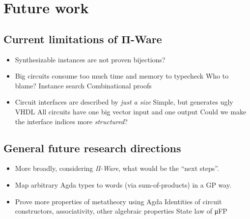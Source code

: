 
    \section{Future work}
    \label{sec:future-work}

        \subsection{Current limitations of Π-Ware}
        \label{subsec:current-limitations}
            \begin{itemize}
                \item Synthesizable instances are not proven bijections?
                \item Big circuits consume too much time and memory to typecheck
                    \subitem Who to blame?
                    \subitem Instance search
                    \subitem Combinational proofs
                \item Circuit interfaces are described by \emph{just a size}
                    \subitem Simple, but generates ugly VHDL
                    \subitem All circuits have one big vector input and one output
                    \subitem Could we make the interface indices more \emph{structured}?
            \end{itemize}

        \subsection{General future research directions}
        \label{subsec:future-research}
            \begin{itemize}
                \item More broadly, considering \emph{Π-Ware}, what would be the ``next steps''.
                \item Map arbitrary Agda types to words (via sum-of-products) in a GP way.
                \item Prove more properties of metatheory using Agda
                    \subitem Identities of circuit constructors, associativity, other algebraic properties
                    \subitem State law of μFP
            \end{itemize}
